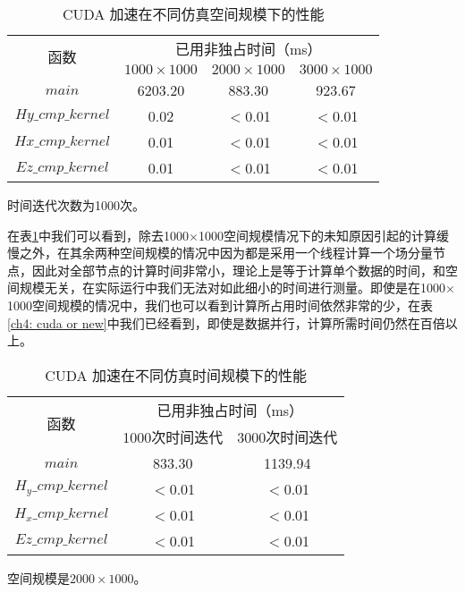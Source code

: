 \begin{table}[hp]
	\centering
	\begin{threeparttable}
		\caption{CUDA 加速在不同仿真空间规模下的性能}\label{ch4: cuda, size}
		\begin{tabular}{cccc}
			\toprule
			\multirow{2}{2em}{函数}&\multicolumn{3}{c}{已用非独占时间（ms）}\\ 
			\cline{2-4}
			& $1000\times1000$ & $2000\times1000$ & $3000\times1000$\\ 
			
			\midrule
			$main$ & 6203.20 & 883.30 & 923.67 \\
			$Hy\_cmp\_kernel$ & 0.02 & $<$0.01 & $<$0.01\\ 
			$Hx\_cmp\_kernel$ & 0.01 & $<$0.01 & $<$0.01\\ 
			$Ez\_cmp\_kernel$ & 0.01 & $<$0.01 & $<$0.01\\
			\bottomrule
		\end{tabular}
		\begin{tablenotes}
			\item[1] 时间迭代次数为1000次。
		\end{tablenotes}
	\end{threeparttable}
\end{table}

在表\ref{ch4: cuda, size}中我们可以看到，除去1000$\times$1000空间规模情况下的未知原因引起的计算缓慢之外，在其余两种空间规模的情况中因为都是采用一个线程计算一个场分量节点，因此对全部节点的计算时间非常小，理论上是等于计算单个数据的时间，和空间规模无关，在实际运行中我们无法对如此细小的时间进行测量。即使是在1000$\times$1000空间规模的情况中，我们也可以看到计算所占用时间依然非常的少，在表\ref{ch4: cuda or new}中我们已经看到，即使是数据并行，计算所需时间仍然在百倍以上。

\begin{table}[hp]
	\centering
	\begin{threeparttable}
		\caption{CUDA 加速在不同仿真时间规模下的性能}\label{ch4: cuda, time}
		\begin{tabular}{ccc}
			\toprule
			\multirow{2}{2em}{函数}&\multicolumn{2}{c}{已用非独占时间（ms）}\\ 
			\cline{2-3}
			& 1000次时间迭代 & 3000次时间迭代\\ 
			
			\midrule
			$main$ & 833.30 & 1139.94 \\ 
			$H_y\_cmp\_kernel$ & $<$0.01 & $<$0.01 \\ 
			$H_x\_cmp\_kernel$& $<$0.01 & $<$0.01\\ 
			$Ez\_cmp\_kernel$& $<$0.01 & $<$0.01\\
			\bottomrule
		\end{tabular}
		\begin{tablenotes}
			\item[1] 空间规模是$2000\times1000$。
		\end{tablenotes}
	\end{threeparttable}
\end{table}

